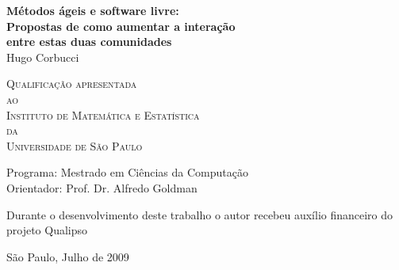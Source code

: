 \documentclass[12pt,twoside,letterpaper]{book}
\begin{document}
\frontmatter \onehalfspacing %

\thispagestyle{empty}
\begin{center}
  \vspace*{2.3cm}
  \textbf{\Large{Métodos ágeis e software livre:\\
      Propostas de como aumentar a interação\\
      entre estas duas comunidades}}\\
	
  \vspace*{1.2cm} \Large{Hugo Corbucci}
    
  \vskip 2cm \textsc{
    Qualificação apresentada\\[-0.25cm]
    ao\\[-0.25cm]
    Instituto de Matemática e Estatística\\[-0.25cm]
    da\\[-0.25cm]
    Universidade de São Paulo}
    
  \vskip 1.5cm
  Programa: Mestrado em Ciências da Computação\\
  Orientador: Prof. Dr. Alfredo Goldman

  \vskip 1cm \normalsize{Durante o desenvolvimento deste trabalho o
    autor recebeu auxílio financeiro do projeto Qualipso}
	
  \vskip 0.5cm \normalsize{São Paulo, Julho de 2009}
\end{center}

%
%
%
%
%	
%	  
\end{document}

